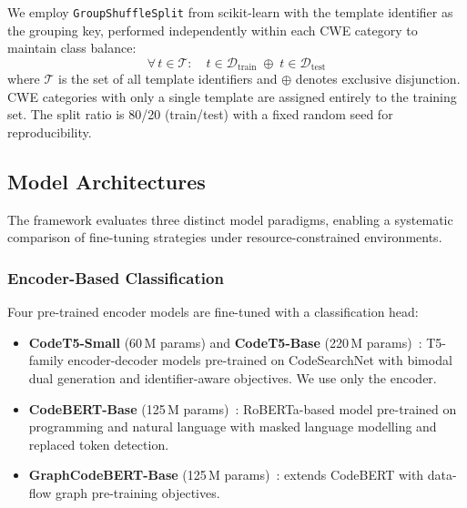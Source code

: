 \documentclass[conference]{IEEEtran}
\begin{document}
We employ \texttt{GroupShuffleSplit} from scikit-learn with the template
identifier as the grouping key, performed independently within each CWE
category to maintain class balance:
\begin{equation}
    \forall\, t \in \mathcal{T}: \quad t \in \mathcal{D}_{\text{train}}
    \;\oplus\; t \in \mathcal{D}_{\text{test}}
\label{eq:template_split}
\end{equation}
where $\mathcal{T}$ is the set of all template identifiers and $\oplus$
denotes exclusive disjunction.  CWE categories with only a single template
are assigned entirely to the training set.  The split ratio is 80/20
(train/test) with a fixed random seed for reproducibility.

\subsection{Model Architectures}
\label{sec:model}

The framework evaluates three distinct model paradigms, enabling a
systematic comparison of fine-tuning strategies under resource-constrained
environments.

\subsubsection{Encoder-Based Classification}
Four pre-trained encoder models are fine-tuned with a classification head:

\begin{itemize}
    \item \textbf{CodeT5-Small} (60\,M params) and \textbf{CodeT5-Base}
          (220\,M params)~\cite{wang2021codet5}: T5-family encoder-decoder
          models pre-trained on CodeSearchNet with bimodal dual generation
          and identifier-aware objectives.  We use only the encoder.
    \item \textbf{CodeBERT-Base} (125\,M params)~\cite{feng2020codebert}:
          RoBERTa-based model pre-trained on programming and natural
          language with masked language modelling and replaced token
          detection.
    \item \textbf{GraphCodeBERT-Base} (125\,M params)~\cite{guo2020graphcodebert}:
          extends CodeBERT with data-flow graph pre-training objectives.
\end{itemize}
\end{document}
